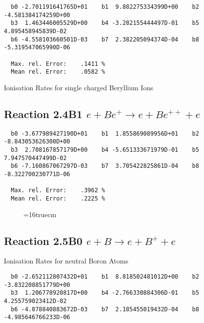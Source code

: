 \documentclass[12pt]{article}
\begin{document}
\begin{small}\begin{verbatim}
  b0 -2.701191641765D+01    b1  9.882275334399D+00    b2 -4.581384174259D+00
  b3  1.463446005529D+00    b4 -3.282155444497D-01    b5  4.895458945839D-02
  b6 -4.558103660501D-03    b7  2.382205094374D-04    b8 -5.319547065990D-06

  Max. rel. Error:    .1411 %
  Mean rel. Error:    .0582 %

\end{verbatim}\end{small}

 Ionisation Rates for
 single charged Beryllium Ions

\subsection{
Reaction 2.4B1  $e + Be^+ \rightarrow e + Be^{++} + e $
}


\begin{small}\begin{verbatim}
  b0 -3.677989427190D+01    b1  1.855869089956D+01    b2 -8.843053626300D+00
  b3  2.708167857179D+00    b4 -5.651333671979D-01    b5  7.947570447499D-02
  b6 -7.160867067297D-03    b7  3.705422825861D-04    b8 -8.322700230771D-06

  Max. rel. Error:    .3962 %
  Mean rel. Error:    .2225 %

\end{verbatim}\end{small}

\begin{figure} \label{2.4B}
\epsfxsize=16truecm
\end{figure}
\newpage

\subsection{
Reaction 2.5B0   $e + B \rightarrow e + B^+ + e $
}

 Ionisation Rates for neutral Boron Atoms


\begin{small}\begin{verbatim}
  b0 -2.652112807432D+01    b1  8.818502481012D+00    b2 -3.832208851779D+00
  b3  1.206778920817D+00    b4 -2.766330884306D-01    b5  4.255759023412D-02
  b6 -4.078840883672D-03    b7  2.185455019432D-04    b8 -4.985646766233D-06
\end{verbatim}\end{small}
\end{document}
